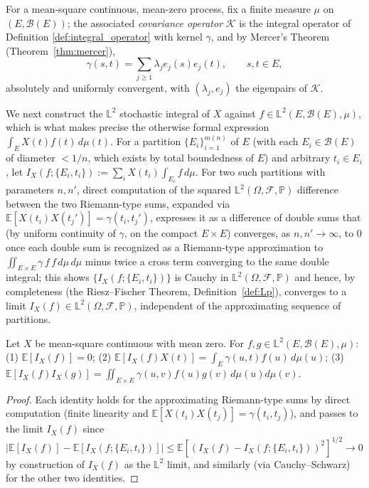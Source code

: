 For a mean-square continuous, mean-zero process, fix a finite measure
$\mu$ on $(E,\mathcal{B}(E))$; the associated \emph{covariance operator}
$\mathcal{K}$ is the integral operator of Definition
\ref{def:integral_operator} with kernel $\gamma$, and by Mercer's Theorem
(Theorem~\ref{thm:mercer}),
\begin{equation}
\gamma(s,t) = \sum_{j\geq 1}\lambda_je_j(s)e_j(t), \qquad s,t\in E,
\label{eq:covariance_mercer}
\end{equation}
absolutely and uniformly convergent, with $(\lambda_j,e_j)$ the
eigenpairs of $\mathcal{K}$.

We next construct the $\mathbb{L}^2$ stochastic integral of $X$ against
$f\in\mathbb{L}^2(E,\mathcal{B}(E),\mu)$, which is what makes precise the
otherwise formal expression $\int_EX(t)f(t)\,d\mu(t)$. For a partition
$\{E_i\}_{i=1}^{m(n)}$ of $E$ (with each $E_i\in\mathcal{B}(E)$ of diameter
$<1/n$, which exists by total boundedness of $E$) and arbitrary $t_i\in
E_i$, let $I_X(f;\{E_i,t_i\}) := \sum_iX(t_i)\int_{E_i}f\,d\mu$. For two
such partitions with parameters $n,n'$, direct computation of the squared
$\mathbb{L}^2(\Omega,\mathcal{F},\mathbb{P})$ difference between the two
Riemann-type sums, expanded via $\mathbb{E}[X(t_i)X(t_j')]=\gamma(t_i,
t_j')$, expresses it as a difference of double sums that (by uniform
continuity of $\gamma$, on the compact $E\times E$) converges, as $n,n'
\to\infty$, to $0$ once each double sum is recognized as a Riemann-type
approximation to $\iint_{E\times E}\gamma\,f\,f\,d\mu\,d\mu$ minus twice a
cross term converging to the same double integral; this shows
$\{I_X(f;\{E_i,t_i\})\}$ is Cauchy in $\mathbb{L}^2(\Omega,\mathcal{F},
\mathbb{P})$ and hence, by completeness (the Riesz--Fischer Theorem,
Definition~\ref{def:Lp}), converges to a limit $I_X(f)\in\mathbb{L}^2
(\Omega,\mathcal{F},\mathbb{P})$, independent of the approximating
sequence of partitions.

\begin{theorem}
\label{thm:stochastic_integral}
Let $X$ be mean-square continuous with mean zero. For $f,g\in\mathbb{L}^2
(E,\mathcal{B}(E),\mu)$: (1) $\mathbb{E}[I_X(f)]=0$; (2) $\mathbb{E}[I_X
(f)X(t)] = \int_E\gamma(u,t)f(u)\,d\mu(u)$; (3) $\mathbb{E}[I_X(f)I_X(g)]
= \iint_{E\times E}\gamma(u,v)f(u)g(v)\,d\mu(u)d\mu(v)$.
\end{theorem}

\begin{proof}
Each identity holds for the approximating Riemann-type sums by direct
computation (finite linearity and $\mathbb{E}[X(t_i)X(t_j)]=\gamma(t_i,
t_j)$), and passes to the limit $I_X(f)$ since $|\mathbb{E}[I_X(f)]-
\mathbb{E}[I_X(f;\{E_i,t_i\})]| \leq \mathbb{E}[(I_X(f)-I_X(f;\{E_i,t_i
\}))^2]^{1/2}\to 0$ by construction of $I_X(f)$ as the $\mathbb{L}^2$
limit, and similarly (via Cauchy--Schwarz) for the other two identities.
\end{proof}

